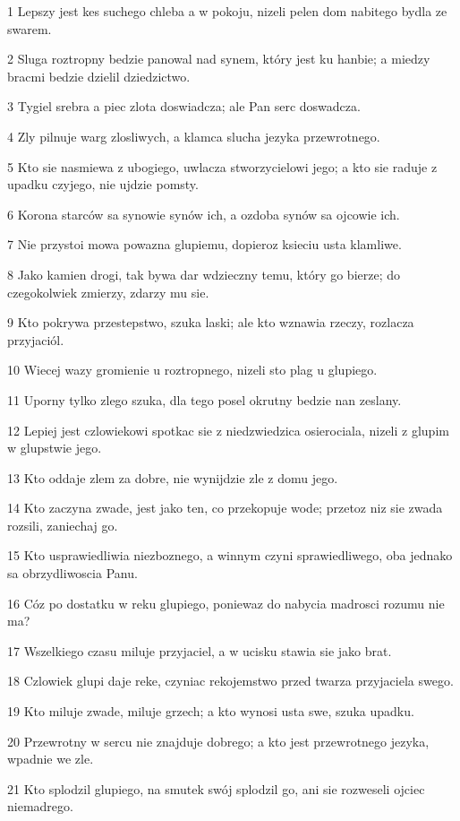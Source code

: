 \par 1 Lepszy jest kes suchego chleba a w pokoju, nizeli pelen dom nabitego bydla ze swarem.
\par 2 Sluga roztropny bedzie panowal nad synem, który jest ku hanbie; a miedzy bracmi bedzie dzielil dziedzictwo.
\par 3 Tygiel srebra a piec zlota doswiadcza; ale Pan serc doswadcza.
\par 4 Zly pilnuje warg zlosliwych, a klamca slucha jezyka przewrotnego.
\par 5 Kto sie nasmiewa z ubogiego, uwlacza stworzycielowi jego; a kto sie raduje z upadku czyjego, nie ujdzie pomsty.
\par 6 Korona starców sa synowie synów ich, a ozdoba synów sa ojcowie ich.
\par 7 Nie przystoi mowa powazna glupiemu, dopieroz ksieciu usta klamliwe.
\par 8 Jako kamien drogi, tak bywa dar wdzieczny temu, który go bierze; do czegokolwiek zmierzy, zdarzy mu sie.
\par 9 Kto pokrywa przestepstwo, szuka laski; ale kto wznawia rzeczy, rozlacza przyjaciól.
\par 10 Wiecej wazy gromienie u roztropnego, nizeli sto plag u glupiego.
\par 11 Uporny tylko zlego szuka, dla tego posel okrutny bedzie nan zeslany.
\par 12 Lepiej jest czlowiekowi spotkac sie z niedzwiedzica osierociala, nizeli z glupim w glupstwie jego.
\par 13 Kto oddaje zlem za dobre, nie wynijdzie zle z domu jego.
\par 14 Kto zaczyna zwade, jest jako ten, co przekopuje wode; przetoz niz sie zwada rozsili, zaniechaj go.
\par 15 Kto usprawiedliwia niezboznego, a winnym czyni sprawiedliwego, oba jednako sa obrzydliwoscia Panu.
\par 16 Cóz po dostatku w reku glupiego, poniewaz do nabycia madrosci rozumu nie ma?
\par 17 Wszelkiego czasu miluje przyjaciel, a w ucisku stawia sie jako brat.
\par 18 Czlowiek glupi daje reke, czyniac rekojemstwo przed twarza przyjaciela swego.
\par 19 Kto miluje zwade, miluje grzech; a kto wynosi usta swe, szuka upadku.
\par 20 Przewrotny w sercu nie znajduje dobrego; a kto jest przewrotnego jezyka, wpadnie we zle.
\par 21 Kto splodzil glupiego, na smutek swój splodzil go, ani sie rozweseli ojciec niemadrego.
